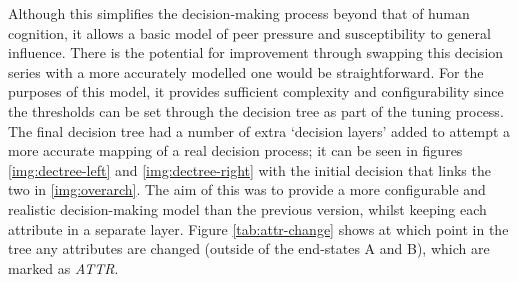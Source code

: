 \documentclass[]{report}
\begin{document}
Although this simplifies the decision-making process beyond that of human cognition, it allows a basic model of peer pressure and susceptibility to general influence. There is the potential for improvement through swapping this decision series with a more accurately modelled one would be straightforward. For the purposes of this model, it provides sufficient complexity and configurability since the thresholds can be set through the decision tree as part of the tuning process.
The final decision tree had a number of extra `decision layers' added to attempt a more accurate mapping of a real decision process; it can be seen in figures \ref{img:dectree-left} and \ref{img:dectree-right} with the initial decision that links the two in \ref{img:overarch}. The aim of this was to provide a more configurable and realistic decision-making model than the previous version, whilst keeping each attribute in a separate layer. Figure \ref{tab:attr-change} shows at which point in the tree any attributes are changed (outside of the end-states A and B), which are marked as \emph{ATTR}.
\end{document}

